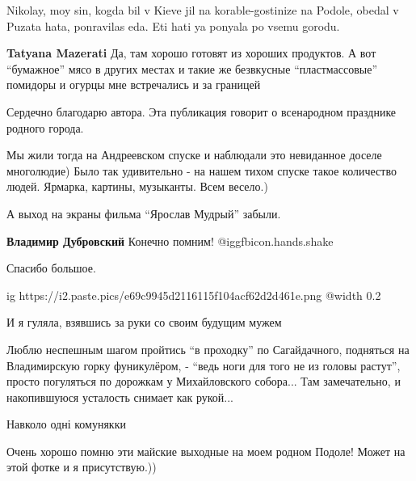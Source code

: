 \begin{itemize}
\begin{itemize} %
Nikolay, moy sin, kogda bil v Kieve jil na korable-gostinize na Podole, obedal v Puzata hata, ponravilas eda. Eti hati ya ponyala po vsemu gorodu.

\textbf{Tatyana Mazerati} Да, там хорошо готовят из хороших продуктов. А вот \enquote{бумажное} мясо в других местах и такие же безвкусные \enquote{пластмассовые} помидоры и огурцы мне встречались и за границей
\end{itemize} %

Сердечно благодарю автора. Эта публикация говорит о всенародном празднике родного города.


Мы жили тогда на Андреевском спуске и наблюдали это невиданное доселе
многолюдие) Было так удивительно - на нашем тихом спуске такое количество
людей. Ярмарка, картины, музыканты. Всем весело.)


А выход на экраны фильма \enquote{Ярослав Мудрый} забыли.

\begin{itemize} %
\textbf{Владимир Дубровский} Конечно помним! @igg{fbicon.hands.shake} 
\end{itemize} %

Спасибо большое.


\ifcmt
  ig https://i2.paste.pics/e69c9945d2116115f104acf62d2d461e.png
  @width 0.2
\fi

И я гуляла, взявшись за руки со своим будущим мужем


Люблю неспешным шагом пройтись \enquote{в проходку} по Сагайдачного, подняться на
Владимирскую горку фуникулёром, - \enquote{ведь ноги для того не из головы растут},
просто погуляться по дорожкам у Михайловского собора... Там замечательно, и
накопившуюся усталость снимает как рукой...

Навколо одні комунякки

Очень хорошо помню эти майские выходные на моем родном Подоле! Может на этой фотке и я присутствую.))

\end{itemize} %
